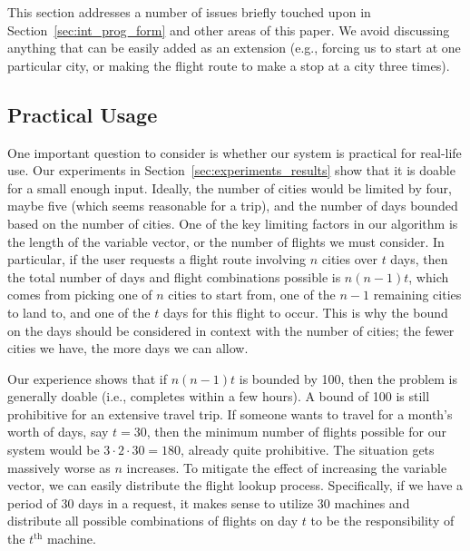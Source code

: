 \documentclass{article}
\begin{document}
This section addresses a number of issues briefly touched upon in Section~\ref{sec:int_prog_form} and other areas of this paper. We avoid discussing
anything that can be easily added as an extension (e.g., forcing us to start at one particular city, or making the flight route to make a stop at a
city three times).

\subsection{Practical Usage}

One important question to consider is whether our system is practical for real-life use. Our experiments in Section~\ref{sec:experiments_results} show
that it is doable for a small enough input. Ideally, the number of cities would be limited by four, maybe five (which seems reasonable for a trip),
and the number of days bounded based on the number of cities. One of the key limiting factors in our algorithm is the length of the variable vector,
or the number of flights we must consider. In particular, if the user requests a flight route involving $n$ cities over $t$ days, then the total
number of days and flight combinations possible is $n(n-1)t$, which comes from picking one of $n$ cities to start from, one of the $n-1$ remaining
cities to land to, and one of the $t$ days for this flight to occur. This is why the bound on the days should be considered in context with the number
of cities; the fewer cities we have, the more days we can allow.

Our experience shows that if $n(n-1)t$ is bounded by 100, then the problem is generally doable (i.e., completes within a few hours).
A bound of 100 is still prohibitive for an extensive travel trip. If someone wants to travel for a month's worth of days, say $t = 30$, then the
minimum number of flights possible for our system would be $3\cdot 2\cdot 30 = 180$, already quite prohibitive. The situation gets massively worse as
$n$ increases. To mitigate the effect of increasing the variable vector, we can easily distribute the flight lookup process. Specifically, if we have
a period of 30 days in a request, it makes sense to utilize 30 machines and distribute all possible combinations of flights on day $t$ to be the
responsibility of the $t^{\text{th}}$ machine.
\end{document}
